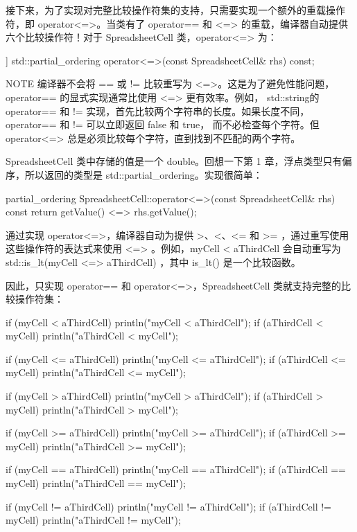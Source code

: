 接下来，为了实现对完整比较操作符集的支持，只需要实现一个额外的重载操作符，即 operator<=>。当类有了 operator== 和 <=> 的重载，编译器自动提供六个比较操作符！对于 SpreadsheetCell 类，operator<=> 为：

\begin{cpp}
[[nodiscard]] std::partial_ordering operator<=>(const SpreadsheetCell& rhs) const;
\end{cpp}

\begin{myNotic}{NOTE}
编译器不会将 == 或 != 比较重写为 <=>。这是为了避免性能问题，operator== 的显式实现通常比使用 <=> 更有效率。例如， std::string的 operator== 和 != 实现，首先比较两个字符串的长度。如果长度不同，operator== 和 != 可以立即返回 false 和 true， 而不必检查每个字符。但operator<=> 总是必须比较每个字符，直到找到不匹配的两个字符。
\end{myNotic}

SpreadsheetCell 类中存储的值是一个 double。回想一下第 1 章，浮点类型只有偏序，所以返回的类型是 std::partial\_ordering。实现很简单：

\begin{cpp}
partial_ordering SpreadsheetCell::operator<=>(const SpreadsheetCell& rhs) const
{
    return getValue() <=> rhs.getValue();
}
\end{cpp}

通过实现 operator<=>，编译器自动为提供 >、<、<= 和 >= ，通过重写使用这些操作符的表达式来使用 <=> 。例如，myCell < aThirdCell 会自动重写为 std::is\_lt(myCell <=> aThirdCell) ，其中 is\_lt() 是一个比较函数。

因此，只实现 operator== 和 operator<=>，SpreadsheetCell 类就支持完整的比较操作符集：

\begin{cpp}
if (myCell < aThirdCell) { println("myCell < aThirdCell"); }
if (aThirdCell < myCell) { println("aThirdCell < myCell"); }

if (myCell <= aThirdCell) { println("myCell <= aThirdCell"); }
if (aThirdCell <= myCell) { println("aThirdCell <= myCell"); }

if (myCell > aThirdCell) { println("myCell > aThirdCell"); }
if (aThirdCell > myCell) { println("aThirdCell > myCell"); }

if (myCell >= aThirdCell) { println("myCell >= aThirdCell"); }
if (aThirdCell >= myCell) { println("aThirdCell >= myCell"); }

if (myCell == aThirdCell) { println("myCell == aThirdCell"); }
if (aThirdCell == myCell) { println("aThirdCell == myCell"); }

if (myCell != aThirdCell) { println("myCell != aThirdCell"); }
if (aThirdCell != myCell) { println("aThirdCell != myCell"); }
\end{cpp}

